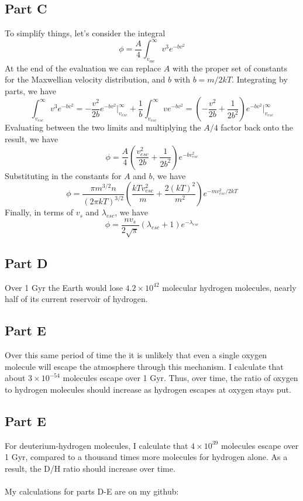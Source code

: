 \documentclass[a4paper, 11pt]{article}
\begin{document}
	\subsection*{Part C}
		To simplify things, let's consider the integral 
		\begin{equation*}
			\phi = \frac{A}{4}\int_{v_\text{esc}}^\infty v^3e^{-bv^2}
		\end{equation*}
		At the end of the evaluation we can replace $A$ with the proper set of constants for the Maxwellian velocity distribution, 
		and $b$ with $b = m/2kT$. Integrating by parts, we have
		\begin{equation*}
			\int_{v_{esc}}^\infty v^3e^{-bv^2} = -\frac{v^2}{2b}e^{-bv^2}\bigg|_{v_{esc}}^\infty + \frac{1}{b}\int_{v_{esc}}^\infty ve^{-bv^2} = \left(-\frac{v^2}{2b}+\frac{1}{2b^2}\right)e^{-bv^2}\bigg|_{v_{esc}}^\infty
		\end{equation*}
		Evaluating between the two limits and multiplying the $A/4$ factor back onto the result, we have
		\begin{equation*}
			\phi = \frac{A}{4} \left(\frac{v_{esc}^2}{2b} + \frac{1}{2b^2}\right)e^{-bv_{esc}^2}
		\end{equation*}
		Substituting in the constants for $A$ and $b$, we have
		\begin{equation*}
			\phi = \frac{\pi m^{3/2}n}{(2\pi kT)^{3/2}} \left(\frac{kTv_{esc}^2}{m} + \frac{2(kT)^2}{m^2}\right)e^{-mv_{esc}^2/2kT}
		\end{equation*}
		Finally, in terms of $v_s$ and $\lambda_{esc}$, we have
		\begin{equation*}
			\phi = \frac{nv_s}{2\sqrt{\pi}}(\lambda_{esc} + 1)e^{-\lambda_{esc}}
		\end{equation*}
	\subsection*{Part D}
		Over 1 Gyr the Earth would lose $4.2\times10^{42}$ molecular hydrogen molecules, nearly half of its current reservoir of 
		hydrogen. 
	\subsection*{Part E}
		Over this same period of time the it is unlikely that even a single oxygen molecule will escape the atmosphere through this 
		mechanism. I calculate that about $3\times10^{-54}$ molecules escape over 1 Gyr. Thus, over time, the ratio of oxygen to 
		hydrogen molecules should increase as hydrogen escapes at oxygen stays put.
	\subsection*{Part E}
		For deuterium-hydrogen molecules, I calculate that $4\times10^{39}$ molecules escape over 1 Gyr, compared to a thousand 
		times more molecules for hydrogen alone. As a result, the D/H ratio should increase over time. 
		\ \\ \\
		My calculations for parts D-E are on my github: 
	
	
\end{document}
